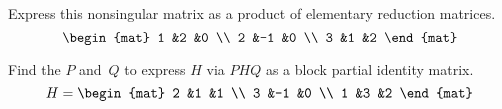 \documentclass[11pt,noanswers]{examjh}
\begin{document}
\begin{questions}
\question
  Express this nonsingular matrix as a product of elementary reduction
  matrices.
  \begin{equation*}
    \begin{mat}
      1 &2  &0 \\
      2 &-1 &0 \\
      3 &1 &2
    \end{mat}
  \end{equation*}

\question
  Find the $P$ and~$Q$ to express $H$ via $PHQ$ as a block partial identity
  matrix.
  \begin{equation*}
    H=
    \begin{mat}
      2 &1  &1  \\
      3 &-1 &0  \\
      1 &3  &2 
    \end{mat}
  \end{equation*}


\end{questions}
\end{document}
